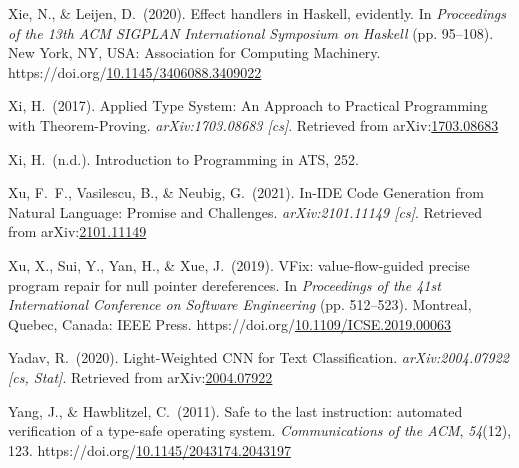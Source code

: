\documentclass[12pt,twoside]{article}
\begin{document}
{\begin{thebibliography}{1079}
\mdbibitemlabel{}Xie, N., \& Leijen, D.~(2020). Effect handlers in Haskell, evidently. In \emph{Proceedings of the 13th ACM SIGPLAN International Symposium on Haskell} (pp. 95–108). New York, NY, USA: Association for Computing Machinery. https://doi.org/\href{https://dx.doi.org/10.1145/3406088.3409022}{10.1145/3406088.3409022}%

\mdbibitemlabel{}Xi, H.~(2017). Applied Type System: An Approach to Practical Programming with Theorem-Proving. \emph{arXiv:1703.08683 {}[cs]}. Retrieved from arXiv:\href{http://arxiv.org/abs/1703.08683}{1703.08683}%

\mdbibitemlabel{}Xi, H.~(n.d.). Introduction to Programming in ATS, 252.%

\mdbibitemlabel{}Xu, F.~F., Vasilescu, B., \& Neubig, G.~(2021). In-IDE Code Generation from Natural Language: Promise and Challenges. \emph{arXiv:2101.11149 {}[cs]}. Retrieved from arXiv:\href{http://arxiv.org/abs/2101.11149}{2101.11149}%

\mdbibitemlabel{}Xu, X., Sui, Y., Yan, H., \& Xue, J.~(2019). VFix: value-flow-guided precise program repair for null pointer dereferences. In \emph{Proceedings of the 41st International Conference on Software Engineering} (pp. 512–523). Montreal, Quebec, Canada: IEEE Press. https://doi.org/\href{https://dx.doi.org/10.1109/ICSE.2019.00063}{10.1109/ICSE.2019.00063}%

\mdbibitemlabel{}Yadav, R.~(2020). Light-Weighted CNN for Text Classification. \emph{arXiv:2004.07922 {}[cs, Stat]}. Retrieved from arXiv:\href{http://arxiv.org/abs/2004.07922}{2004.07922}%

\mdbibitemlabel{}Yang, J., \& Hawblitzel, C.~(2011). Safe to the last instruction: automated verification of a type-safe operating system. \emph{Communications of the ACM}, \emph{54}(12), 123. https://doi.org/\href{https://dx.doi.org/10.1145/2043174.2043197}{10.1145/2043174.2043197}%


\end{thebibliography}}
\end{document}
